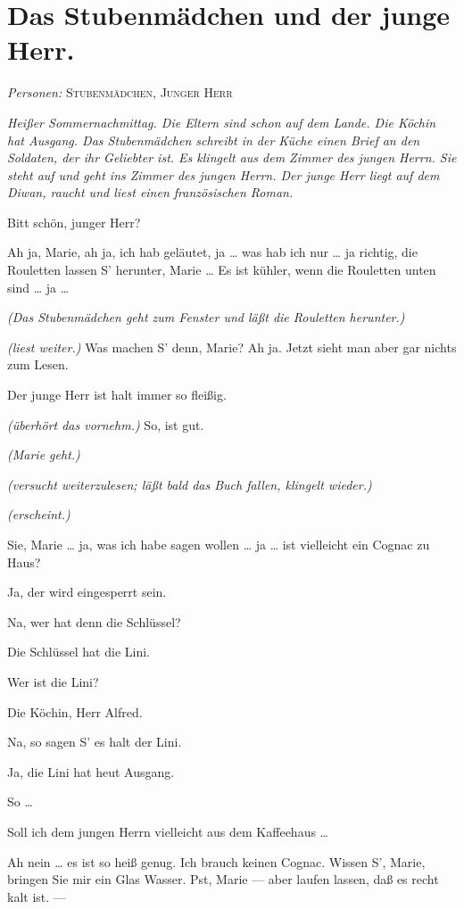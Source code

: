 \documentclass[
	final,
	a4paper,
	ngerman,
	mpinclude = true, %
	twoside = true,
	open = right,
	cleardoublepage = plain,
	DIV = 13,
	BCOR = 1cm,
	titlepage = firstiscover,
	]{scrbook}
\newcommand{\scene}{\section}
\newcommand{\direction}[1]{\textit{(#1)}}
\newcommand{\setting}[1]{\vspace{-0.5\baselineskip}\centering\textit{#1}}
\newcommand{\characterlist}[1]{{\begin{center}\textit{Personen:} #1\end{center}}}
\newcommand{\thecharacter}[1]{\textup{\textsc{#1}}}
\newcommand{\themaedchen}{\thecharacter{Stubenmädchen}}
\newcommand{\theherr}{\thecharacter{Junger Herr}}
\newcommand{\character}[1]{\item[#1:]}
\newcommand{\maedchen}{\character{\themaedchen}}
\newcommand{\herr}{\character{\theherr}}
\begin{document}
\scene{Das Stubenmädchen und der junge Herr.}
\characterlist{\themaedchen, \theherr}
\setting{Heißer Sommernachmittag. Die Eltern sind schon auf dem Lande. Die Köchin hat Ausgang. Das Stubenmädchen schreibt in der Küche einen Brief an den Soldaten, der ihr Geliebter ist. Es klingelt aus dem Zimmer des jungen Herrn. Sie steht auf und geht ins Zimmer des jungen Herrn. Der junge Herr liegt auf dem Diwan, raucht und liest einen französischen Roman.}
\begin{play}
	\maedchen
	Bitt schön, junger Herr?

	\herr
	Ah ja, Marie, ah ja, ich hab geläutet, ja \ldots{} was hab ich nur \ldots{} ja richtig, die Rouletten lassen S' herunter, Marie \ldots{} Es ist kühler, wenn die Rouletten unten sind \ldots{} ja \ldots{}

	\direction{Das Stubenmädchen geht zum Fenster und läßt die Rouletten herunter.}

	\herr
	\direction{liest weiter.} Was machen S' denn, Marie? Ah ja. Jetzt sieht man aber gar nichts zum Lesen.

	\maedchen
	Der junge Herr ist halt immer so fleißig.

	\herr
	\direction{überhört das vornehm.} So, ist gut.

	\direction{Marie geht.}

	\herr
	\direction{versucht weiterzulesen; läßt bald das Buch fallen, klingelt wieder.}

	\maedchen
	\direction{erscheint.}

	\herr
	Sie, Marie \ldots{} ja, was ich habe sagen wollen \ldots{} ja \ldots{} ist vielleicht ein Cognac zu Haus?

	\maedchen
	Ja, der wird eingesperrt sein.

	\herr
	Na, wer hat denn die Schlüssel?

	\maedchen
	Die Schlüssel hat die Lini.

	\herr
	Wer ist die Lini?

	\maedchen
	Die Köchin, Herr Alfred.

	\herr
	Na, so sagen S' es halt der Lini.

	\maedchen
	Ja, die Lini hat heut Ausgang.

	\herr
	So \ldots{}

	\maedchen
	Soll ich dem jungen Herrn vielleicht aus dem Kaffeehaus \ldots{}

	\herr
	Ah nein \ldots{} es ist so heiß genug. Ich brauch keinen Cognac. Wissen S', Marie, bringen Sie mir ein Glas Wasser. Pst, Marie --- aber laufen lassen, daß es recht kalt ist. ---


\end{play}
\end{document}

